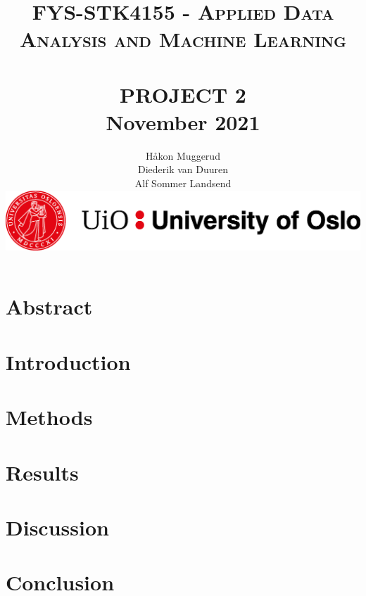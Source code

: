 \documentclass[12pt,a4paper]{article}
\title{	\normalsize \textsc{FYS-STK4155 - Applied Data Analysis and Machine Learning} 	%
		 	\\[2.0cm]								%
			\HRule{2pt} \\	[0.5cm]				%
			\LARGE \textbf{\uppercase{Project 2}}	%
			\HRule{2pt} \\ [0.5cm]		%
         \normalsize November 2021 \\
		}
\author{
		Håkon Muggerud\\
		Diederik van Duuren \\
		Alf Sommer Landsend
      \begin{center}       
         \includegraphics[width=\textwidth]{UiO.png}
      \end{center}
}
\makeatletter
\def\printtitle{%
   {\centering \@title\par}}
\def\printauthor{%
   {\centering \large \@author}}
\makeatother
\begin{document}
\thispagestyle{empty}		%

\printtitle					%
  	\vfill
\printauthor				%
\newpage

\tableofcontents
\thispagestyle{empty}
\newpage

\section{Abstract}
\section{Introduction}
\section{Methods}
\section{Results}
\section{Discussion}
\section{Conclusion}

\end{document}

